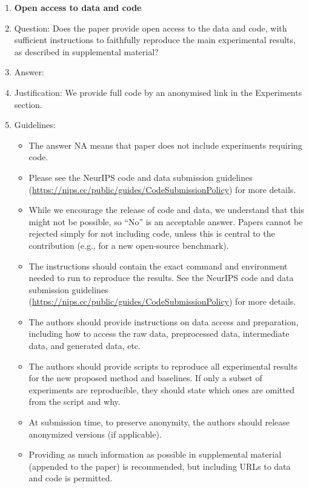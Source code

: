 \documentclass{article}
\theoremstyle{plain}
\theoremstyle{definition}
\theoremstyle{remark}
\theoremstyle{plain}
\begin{document}
\begin{enumerate}
\item {\bf Open access to data and code}
    \item[] Question: Does the paper provide open access to the data and code, with sufficient instructions to faithfully reproduce the main experimental results, as described in supplemental material?
    \item[] Answer: \answerYes{} %
    \item[] Justification: We provide full code by an anonymised link in the Experiments section. 
    \item[] Guidelines:
    \begin{itemize}
        \item The answer NA means that paper does not include experiments requiring code.
        \item Please see the NeurIPS code and data submission guidelines (\url{https://nips.cc/public/guides/CodeSubmissionPolicy}) for more details.
        \item While we encourage the release of code and data, we understand that this might not be possible, so “No” is an acceptable answer. Papers cannot be rejected simply for not including code, unless this is central to the contribution (e.g., for a new open-source benchmark).
        \item The instructions should contain the exact command and environment needed to run to reproduce the results. See the NeurIPS code and data submission guidelines (\url{https://nips.cc/public/guides/CodeSubmissionPolicy}) for more details.
        \item The authors should provide instructions on data access and preparation, including how to access the raw data, preprocessed data, intermediate data, and generated data, etc.
        \item The authors should provide scripts to reproduce all experimental results for the new proposed method and baselines. If only a subset of experiments are reproducible, they should state which ones are omitted from the script and why.
        \item At submission time, to preserve anonymity, the authors should release anonymized versions (if applicable).
        \item Providing as much information as possible in supplemental material (appended to the paper) is recommended, but including URLs to data and code is permitted.
    \end{itemize}



\end{enumerate}
\end{document}
